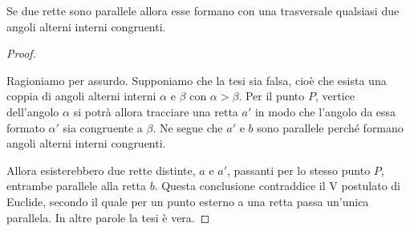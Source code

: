 %     

\begin{teorema}
  Se due rette sono parallele allora esse formano con una trasversale 
  qualsiasi due angoli alterni interni congruenti.
\end{teorema}

\begin{proof}
~

\noindent \begin{minipage}{0.6\textwidth}
    Ragioniamo per assurdo. Supponiamo che la tesi sia falsa, cioè che 
    esista una coppia di angoli alterni interni $\alpha$ e $\beta$ con 
    $\alpha>\beta$. Per il punto $P$, vertice dell'angolo $\alpha$ si 
    potrà allora tracciare una retta $a'$ in modo che l'angolo da essa 
    formato $\alpha'$ sia congruente a $\beta$. Ne segue che $a'$ e $b$ 
    sono parallele perché formano angoli alterni interni congruenti.
\end{minipage}\hfil
\begin{minipage}{0.4\textwidth}
  \centering
\end{minipage} 
    Allora esisterebbero due rette distinte, $a$ e $a'$, passanti per lo 
    stesso punto $P$, entrambe parallele alla retta $b$. 
Questa conclusione contraddice il V postulato di Euclide, secondo il quale 
per un punto esterno a una retta passa un'unica parallela. In altre 
parole la tesi è vera.
  \end{proof}

